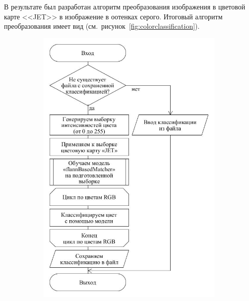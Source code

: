 \documentclass[14pt, a4paper]{extreport}
\begin{document}
	В результате был разработан алгоритм преобразования изображения в цветовой карте <<JET>> в изображение в оотенках серого. Итоговый алгоритм преобразования имеет вид (см.~рисунок~\ref{fig:colorclassification}).
	
	\begin{figure}[h!]
		\begin{subfigure}{.6\textwidth}
			\centering
			\includegraphics[width = \textwidth]{image/chapter_2/colorclassification}
			\caption{}
		\end{subfigure}
		\begin{subfigure}{.31\textwidth}
			\centering

\end{subfigure}
\end{figure}
\end{document}
